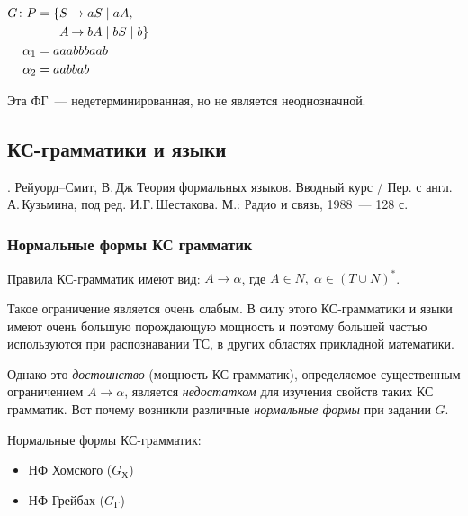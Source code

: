 \begin{ex}
  \ 
  
  $\begin{aligned}[t]
    G\colon P &= \{S \to aS \mid aA,  \\
    \phantom{G\colon P } & \phantom{\mathrel{{} = \{}}
    \lefteqn{A}\phantom{S} \to bA \mid bS \mid b\}\\
    \alpha_1 &= aaabbbaab \\
    \alpha_2 &= aabbab
  \end{aligned}
  $

  Эта ФГ~--- недетерминированная, но не является неоднозначной.
\end{ex}


\subsection{КС-грамматики и языки}

. Рейуорд--Смит, В.\,Дж Теория формальных языков. Вводный курс /
Пер. с англ. А.\,Кузьмина, под ред. И.Г.\,Шестакова. М.: Радио и
связь, 1988~--- 128 с.


\subsubsection{Нормальные формы КС грамматик}

Правила КС-грамматик имеют вид: 
$A \to \alpha$, где $A\in N,\;\alpha \in (T \cup N)^*$.

Такое ограничение является очень слабым. В силу этого КС-грамматики и
языки имеют очень большую порождающую мощность и поэтому большей
частью используются при распознавании ТС, в других областях прикладной
математики.

Однако это \emph{достоинство} (мощность КС-грамматик), определяемое
существенным ограничением $A \to \alpha$, является
\emph{недостатком} для изучения свойств таких КС грамматик. Вот почему
возникли различные \emph{нормальные формы} при задании $G$.

Нормальные формы КС-грамматик:
\begin{itemize}
\item НФ Хомского ($G_Х$)
\item НФ Грейбах ($G_Г$)
\end{itemize}

